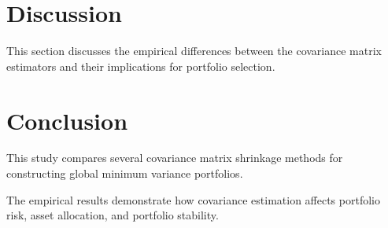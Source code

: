 \documentclass[12pt,a4paper]{article}
\begin{document}
	
	
	\section{Discussion}
	
	This section discusses the empirical differences between
	the covariance matrix estimators and their implications for
	portfolio selection.
	
	
	
	\section{Conclusion}
	
	This study compares several covariance matrix shrinkage
	methods for constructing global minimum variance portfolios.
	
	The empirical results demonstrate how covariance estimation
	affects portfolio risk, asset allocation, and portfolio
	stability.
	
	
	
	\nocite{*}
	
	
	
\end{document}
